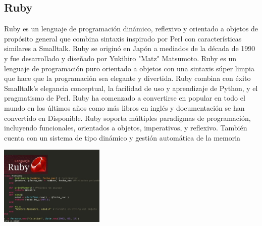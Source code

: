 \documentclass[twoside,twocolumn]{article}
\begin{document}
\subsection{Ruby }
Ruby es un lenguaje de programación dinámico, reflexivo y orientado a objetos de propósito general que combina sintaxis
inspirado por Perl con características similares a Smalltalk. Ruby se originó en Japón a mediados de la década de 1990 y fue
desarrollado y diseñado por Yukihiro "Matz" Matsumoto. Ruby es un lenguaje de programación puro orientado a objetos
con una sintaxis súper limpia que hace que la programación sea elegante y divertida. Ruby combina con éxito Smalltalk's
elegancia conceptual, la facilidad de uso y aprendizaje de Python, y el pragmatismo de Perl. Ruby ha comenzado a convertirse en
popular en todo el mundo en los últimos años como más libros en inglés y documentación se han convertido en
Disponible. Ruby soporta múltiples paradigmas de programación, incluyendo funcionales, orientados a objetos, imperativos,
y reflexivo. También cuenta con un sistema de tipo dinámico y gestión automática de la memoria
\begin{center}
	\includegraphics[width=5cm]{./Imagenes/2} 
	\end{center}
\end{document}
